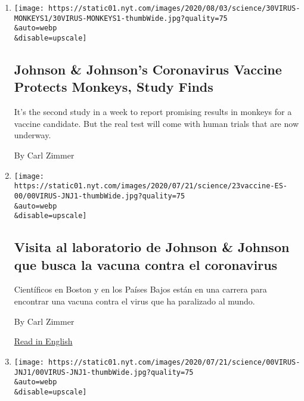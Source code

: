 \begin{enumerate}
\def\labelenumi{\arabic{enumi}.}
\item
  \href{/2020/07/30/health/covid-19-vaccine-monkeys.html}{}

  \texttt{[image: https://static01.nyt.com/images/2020/08/03/science/30VIRUS-MONKEYS1/30VIRUS-MONKEYS1-thumbWide.jpg?quality=75\\\&auto=webp\\\&disable=upscale]}

  \hypertarget{johnson--johnsons-coronavirus-vaccine-protects-monkeys-study-finds}{%
  \subsection{Johnson \& Johnson's Coronavirus Vaccine Protects Monkeys,
  Study
  Finds}\label{johnson--johnsons-coronavirus-vaccine-protects-monkeys-study-finds}}

  It's the second study in a week to report promising results in monkeys
  for a vaccine candidate. But the real test will come with human trials
  that are now underway.

  By Carl Zimmer
\item
  \href{/es/2020/07/23/espanol/ciencia-y-tecnologia/vacuna-coronavirus.html}{}

  \texttt{[image: https://static01.nyt.com/images/2020/07/21/science/23vaccine-ES-00/00VIRUS-JNJ1-thumbWide.jpg?quality=75\\\&auto=webp\\\&disable=upscale]}

  \hypertarget{visita-al-laboratorio-de-johnson--johnson-que-busca-la-vacuna-contra-el-coronavirus}{%
  \subsection{Visita al laboratorio de Johnson \& Johnson que busca la
  vacuna contra el
  coronavirus}\label{visita-al-laboratorio-de-johnson--johnson-que-busca-la-vacuna-contra-el-coronavirus}}

  Científicos en Boston y en los Países Bajos están en una carrera para
  encontrar una vacuna contra el virus que ha paralizado al mundo.

  By Carl Zimmer

  \href{https://www.nytimes.com/2020/07/17/health/coronavirus-vaccine-johnson-janssen.html}{Read
  in English}
\item
  \href{/2020/07/17/health/coronavirus-vaccine-johnson-janssen.html}{}

  \texttt{[image: https://static01.nyt.com/images/2020/07/21/science/00VIRUS-JNJ1/00VIRUS-JNJ1-thumbWide.jpg?quality=75\\\&auto=webp\\\&disable=upscale]}


\end{enumerate}

